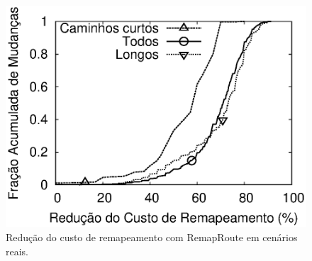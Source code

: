 \documentclass{JBCS}
\newcommand{\rmprt}{{Re\-map\-Rou\-te}}
\begin{document}
\begin{figure}
\begin{center}
\includegraphics[width=0.96\columnwidth]{figs/deploysavings.eps}
\caption{Redução do custo de remapeamento com \rmprt{} em cenários
reais.}
\label{fig:deploy.savings}
\end{center}
\end{figure}
\end{document}
